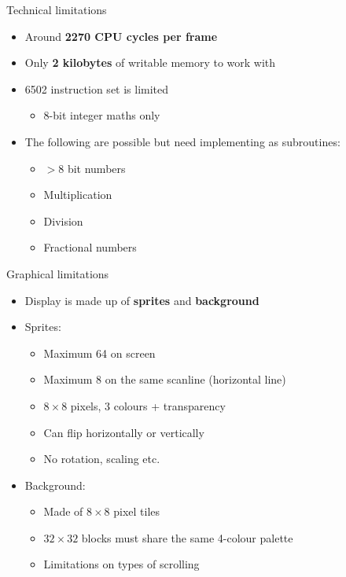 \begin{frame}{Technical limitations}
	\begin{itemize}
		\pause\item Around \textbf{2270 CPU cycles per frame}
		\pause\item Only \textbf{2 kilobytes} of writable memory to work with
		\pause\item 6502 instruction set is limited
			\begin{itemize}
				\pause\item 8-bit integer maths only
			\end{itemize}
		\pause\item The following are possible but need implementing as subroutines:
			\begin{itemize}
				\pause\item $>8$ bit numbers
				\pause\item Multiplication
				\pause\item Division
				\pause\item Fractional numbers
			\end{itemize}
	\end{itemize}
\end{frame}

\begin{frame}{Graphical limitations}
	\begin{itemize}
		\pause\item Display is made up of \textbf{sprites} and \textbf{background}
		\pause\item Sprites:
			\begin{itemize}
				\pause\item Maximum 64 on screen
				\pause\item Maximum 8 on the same scanline (horizontal line)
				\pause\item $8 \times 8$ pixels, 3 colours + transparency
				\pause\item Can flip horizontally or vertically
				\pause\item No rotation, scaling etc.
			\end{itemize}
		\pause\item Background:
			\begin{itemize}
				\pause\item Made of $8 \times 8$ pixel tiles
				\pause\item $32 \times 32$ blocks must share the same 4-colour palette
				\pause\item Limitations on types of scrolling
			\end{itemize}
	\end{itemize}
\end{frame}


